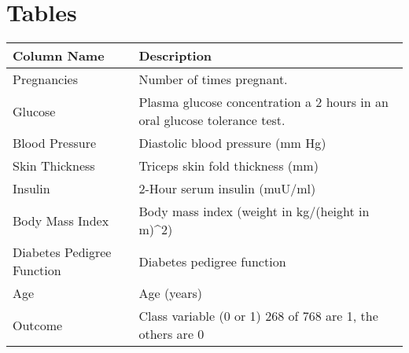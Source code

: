\documentclass[12pt]{article}
\begin{document}
\section{Tables}
{%

\clearpage%
\thispagestyle{empty}%
\begin{landscape}%
\centering %
\begin{table}[]
\centering
\begin{tabular}{|l|l|}
\hline
Column Name                & Description                                                               \\ \hline
Pregnancies                & Number of times pregnant.                                                 \\ \hline
Glucose                    & Plasma glucose concentration a 2 hours in an oral glucose tolerance test. \\ \hline
Blood Pressure             & Diastolic blood pressure (mm Hg)                                          \\ \hline
Skin Thickness             & Triceps skin fold thickness (mm)                                          \\ \hline
Insulin                    & 2-Hour serum insulin (muU/ml)                                            \\ \hline
Body Mass Index            & Body mass index (weight in kg/(height in m)\textasciicircum{}2)           \\ \hline
Diabetes Pedigree Function & Diabetes pedigree function                                                \\ \hline
Age                        & Age (years)                                                               \\ \hline
Outcome                    & Class variable (0 or 1) 268 of 768 are 1, the others are 0                \\ \hline
\end{tabular}
\end{table}
\label{table:1}
\end{landscape}
\clearpage
}
\end{document}
